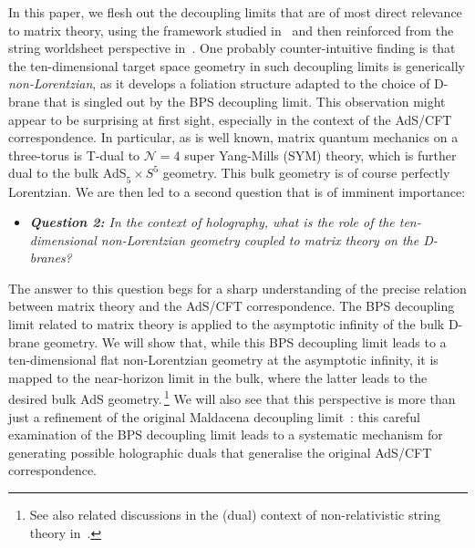 \documentclass[11pt]{article}
\newcommand{\CN}{\mathcal{N}}
\renewcommand{\emph}[1]{\textit{#1}}
\begin{document}
In this paper, we flesh out the decoupling limits that are of most direct relevance to matrix theory, using the framework studied in~\cite{Blair:2023noj} and then reinforced from the string worldsheet perspective in~\cite{Gomis:2023eav}. One probably counter-intuitive finding is that the ten-dimensional target space geometry in such decoupling limits is generically \emph{non-Lorentzian}, as it develops a foliation structure adapted to the choice of D-brane that is singled out by the BPS decoupling limit. This observation might appear to be surprising at first sight, especially in the context of the AdS/CFT correspondence. In particular, as is well known, matrix quantum mechanics on a three-torus is T-dual to $\CN = 4$ super Yang-Mills (SYM) theory, which is further dual to the bulk AdS${}^{}_5 \times S^5$ geometry. This bulk geometry is of course perfectly Lorentzian. We are then led to a second question that is of imminent importance:
%
\begin{itemize}

\item

\emph{\textbf{Question 2:} In the context of holography, what is the role of the ten-dimensional non-Lorentzian geometry coupled to matrix theory on the D-branes?}

\end{itemize}
%
The answer to this question begs for a sharp understanding of the precise relation between matrix theory and the AdS/CFT correspondence. The BPS decoupling limit related to matrix theory is applied to the asymptotic infinity of the bulk D-brane geometry. We will show that, while this BPS decoupling limit leads to a ten-dimensional flat non-Lorentzian geometry at the asymptotic infinity, it is mapped to the near-horizon limit in the bulk, where the latter leads to the desired bulk AdS geometry.\,\footnote{See also related discussions in the (dual) context of non-relativistic string theory in~\cite{Danielsson:2000mu,Avila:2023aey, Guijosa:2023qym, soliton}.} We will also see that this perspective is more than just a refinement of the original Maldacena decoupling limit~\cite{Maldacena:1997re}: this careful examination of the BPS decoupling limit leads to a systematic mechanism for generating possible holographic duals that generalise the original AdS/CFT correspondence. 
\end{document}
